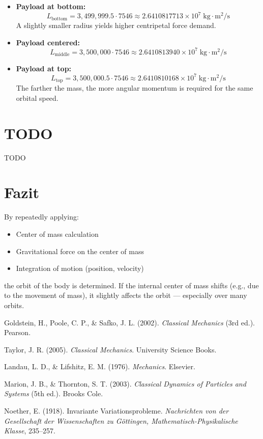 \documentclass[conference]{IEEEtran}
\begin{document}
\begin{itemize}
  \item \textbf{Payload at bottom:}
  \[
  L_\text{bottom} = 3,499,999.5 \cdot 7546 \approx 2.6410817713 \times 10^7 \; \text{kg} \cdot \text{m}^2/\text{s}
  \]
  A slightly smaller radius yields higher centripetal force demand.

  \item \textbf{Payload centered:}
  \[
  L_\text{middle} = 3,500,000 \cdot 7546 \approx 2.6410813940 \times 10^7 \; \text{kg} \cdot \text{m}^2/\text{s}
  \]

  \item \textbf{Payload at top:}
  \[
  L_\text{top} = 3,500,000.5 \cdot 7546 \approx 2.6410810168 \times 10^7 \; \text{kg} \cdot \text{m}^2/\text{s}
  \]
  The farther the mass, the more angular momentum is required for the same orbital speed.
\end{itemize}

\section{TODO}
TODO

\section{Fazit}

By repeatedly applying:
\begin{itemize}
  \item Center of mass calculation
  \item Gravitational force on the center of mass
  \item Integration of motion (position, velocity)
\end{itemize}
the orbit of the body is determined. If the internal center of mass shifts (e.g., due to the movement of mass), it slightly affects the orbit — especially over many orbits.

\begin{thebibliography}{9}

Goldstein, H., Poole, C. P., \& Safko, J. L. (2002). \textit{Classical Mechanics} (3rd ed.). Pearson.

Taylor, J. R. (2005). \textit{Classical Mechanics}. University Science Books.

Landau, L. D., \& Lifshitz, E. M. (1976). \textit{Mechanics}. Elsevier.

Marion, J. B., \& Thornton, S. T. (2003). \textit{Classical Dynamics of Particles and Systems} (5th ed.). Brooks Cole.

Noether, E. (1918). Invariante Variationsprobleme. \textit{Nachrichten von der Gesellschaft der Wissenschaften zu Göttingen, Mathematisch-Physikalische Klasse}, 235--257.

\end{thebibliography}
\end{document}

